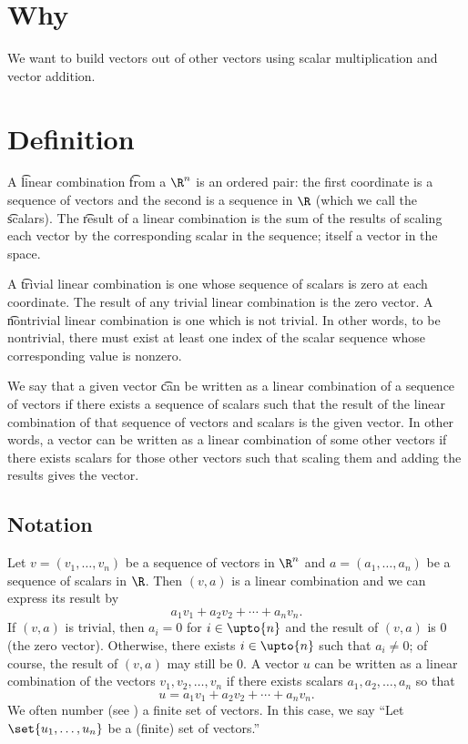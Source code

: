 

\section*{Why}

We want to build vectors out of other vectors using scalar multiplication and vector addition.

\section*{Definition}

A \t{linear combination} \t{from} a $\R ^n$ is an ordered pair: the first coordinate is a sequence of vectors and the second is a sequence in $\R $ (which we call the \t{scalars}).
The \t{result} of a linear combination is the sum of the results of scaling each vector by the corresponding scalar in the sequence; itself a vector in the space.

A \t{trivial linear combination} is one whose sequence of scalars is zero at each coordinate.
The result of any trivial linear combination is the zero vector.
A \t{nontrivial linear combination} is one which is not trivial.
In other words, to be nontrivial, there must exist at least one index of the scalar sequence whose corresponding value is nonzero.

We say that a given vector \t{can be written as a linear combination of} a sequence of vectors if there exists a sequence of scalars such that the result of the linear combination of that sequence of vectors and scalars is the given vector.
In other words, a vector can be written as a linear combination of some other vectors if there exists scalars for those other vectors such that scaling them and adding the results gives the vector.

\subsection*{Notation}

Let $v = (v_1, \dots , v_n)$ be a sequence of vectors in $\R ^n$ and
$a = (a_1, \dots , a_n)$ be a sequence of scalars in $\R $.
Then $(v, a)$ is a linear combination and we can express its result by
\[
a_1v_1 + a_2v_2 + \cdots + a_n v_n.
\]
If $(v,a)$ is trivial, then $a_i = 0$ for $i \in \upto{n}$ and the result of $(v, a)$ is $0$ (the zero vector).
Otherwise, there exists $i \in \upto{n}$ such that $a_i \neq 0$; of course, the result of $(v, a)$ may still be $0$.
A vector $u$ can be written as a linear combination of the vectors $v_1, v_2, \dots , v_n$ if there exists scalars $a_1, a_2, \dots , a_n$ so that
\[
u = a_1v_1 + a_2v_2 + \cdots + a_nv_n.
\]
We often number (see ) a finite set of vectors.
In this case, we say ``Let $\set{u_1, \dots , u_n}$ be a (finite) set of vectors.''

